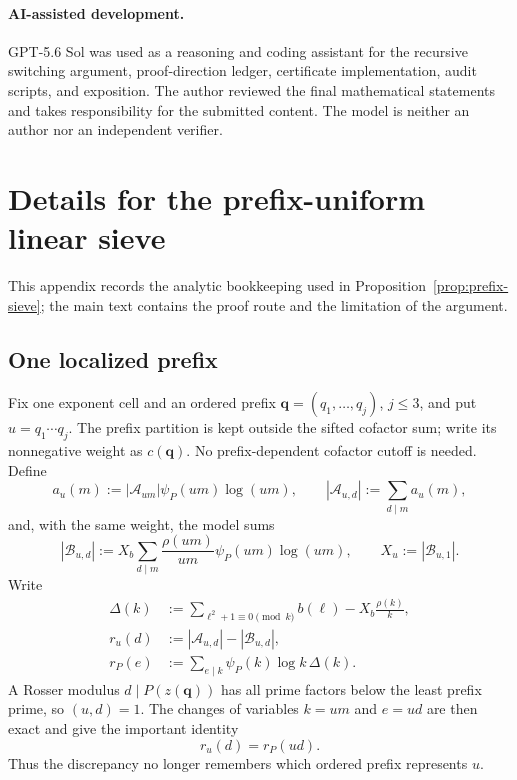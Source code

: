 \documentclass[10pt,reqno]{amsart}
\newcommand{\Acal}{\mathcal{A}}
\newcommand{\Bcal}{\mathcal{B}}
\newcommand{\1}{\mathbf{1}}
\theoremstyle{plain}
\theoremstyle{remark}
\begin{document}
\paragraph{AI-assisted development.}
GPT-5.6 Sol was used as a reasoning and coding assistant for the recursive
switching argument, proof-direction ledger, certificate implementation,
audit scripts, and exposition.  The author reviewed the final mathematical
statements and takes responsibility for the submitted content.  The model is
neither an author nor an independent verifier.

\appendix
\section{Details for the prefix-uniform linear sieve}
\label{app:prefix-sieve}

This appendix records the analytic bookkeeping used in
Proposition~\ref{prop:prefix-sieve}; the main text contains the proof route
and the limitation of the argument.

\subsection{One localized prefix}

Fix one exponent cell and an ordered prefix
\(\boldsymbol q=(q_1,\ldots,q_j)\), \(j\le3\), and put
\(u=q_1\cdots q_j\).  The prefix partition is kept outside the sifted
cofactor sum; write its nonnegative weight as \(c(\boldsymbol q)\).  No
prefix-dependent cofactor cutoff is needed.  Define
\[
 a_u(m):=|\Acal_{um}|\psi_P(um)\log(um),\qquad
 |\Acal_{u,d}|:=\sum_{d\mid m}a_u(m),
\]
and, with the same weight, the model sums
\[
 |\Bcal_{u,d}|:=
 X_b\sum_{d\mid m}\frac{\rho(um)}{um}
 \psi_P(um)\log(um),\qquad X_u:=|\Bcal_{u,1}|.
\]
Write
\begin{equation}\label{eq:prefix-density}
\begin{aligned}
 \Delta(k)&:=\sum_{\ell^2+1\equiv0\pmod k}b(\ell)
              -X_b\frac{\rho(k)}k,\\
 r_u(d)&:=|\Acal_{u,d}|-|\Bcal_{u,d}|,\\
 r_P(e)&:=\sum_{e\mid k}\psi_P(k)\log k\,\Delta(k).
\end{aligned}
\end{equation}
A Rosser modulus \(d\mid P(z(\boldsymbol q))\) has all prime factors below
the least prefix prime, so \((u,d)=1\).  The changes of variables
\(k=um\) and \(e=ud\) are then exact and give the important identity
\begin{equation}\label{eq:prefix-common-discrepancy}
 r_u(d)=r_P(ud).
\end{equation}
Thus the discrepancy no longer remembers which ordered prefix represents
\(u\).
\end{document}
